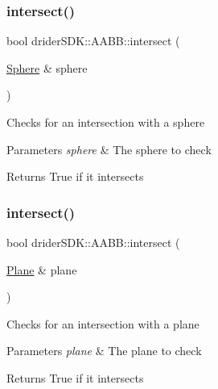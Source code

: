 \subsubsection{\texorpdfstring{intersect()}{intersect()}\hspace{0.1cm}{\footnotesize\ttfamily [2/6]}}
{\footnotesize\ttfamily bool drider\+S\+D\+K\+::\+A\+A\+B\+B\+::intersect (\begin{DoxyParamCaption}\item[{\hyperlink{classdrider_s_d_k_1_1_sphere}{Sphere} \&}]{sphere }\end{DoxyParamCaption})}

Checks for an intersection with a sphere


\begin{DoxyParams}{Parameters}
{\em sphere} & The sphere to check\\
\hline
\end{DoxyParams}
\begin{DoxyReturn}{Returns}
True if it intersects 
\end{DoxyReturn}
\mbox{\label{classdrider_s_d_k_1_1_a_a_b_b_af01eb8270121bccab4eb7a891639ba27}} 
\subsubsection{\texorpdfstring{intersect()}{intersect()}\hspace{0.1cm}{\footnotesize\ttfamily [3/6]}}
{\footnotesize\ttfamily bool drider\+S\+D\+K\+::\+A\+A\+B\+B\+::intersect (\begin{DoxyParamCaption}\item[{\hyperlink{classdrider_s_d_k_1_1_plane}{Plane} \&}]{plane }\end{DoxyParamCaption})}

Checks for an intersection with a plane


\begin{DoxyParams}{Parameters}
{\em plane} & The plane to check\\
\hline
\end{DoxyParams}
\begin{DoxyReturn}{Returns}
True if it intersects 
\end{DoxyReturn}
\mbox{\label{classdrider_s_d_k_1_1_a_a_b_b_a286eedcd8bffca3d22d87f21aab432b1}} 
